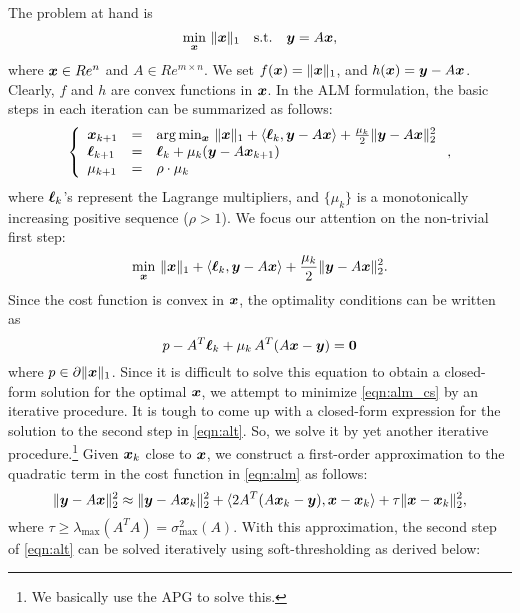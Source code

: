 The problem at hand is 
\begin{equation}
\min_{{\boldsymbol{x}}} \, \|{\boldsymbol{x}}\|_1 \quad \mathrm{s.t.} \quad {\boldsymbol{y}} = A{\boldsymbol{x}},
\end{equation}
where ${\boldsymbol{x}} \in Re^n$ and $A \in Re^{m\times n}$. 
\smallbreak
We set $f({\boldsymbol{x}}) = \|{\boldsymbol{x}}\|_1$, and $h({\boldsymbol{x}}) = {\boldsymbol{y}} - A{\boldsymbol{x}}$. Clearly, $f$ and $h$ are convex functions in ${\boldsymbol{x}}$. In the ALM formulation, the basic steps in each iteration can be summarized as follows:
\begin{equation}
\left \{ 
\begin{array}{lll}
{\boldsymbol{x}}_{k+1} & = & \arg\min_{{\boldsymbol{x}}} \, \|{\boldsymbol{x}}\|_1 + \langle {\boldsymbol\ell}_k, {\boldsymbol{y}} - A{\boldsymbol{x}} \rangle + \frac{\mu_k}{2}\|{\boldsymbol{y}} - A{\boldsymbol{x}}\|_2^2 \\
{\boldsymbol \ell}_{k+1} & = & {\boldsymbol \ell}_k + \mu_k ({\boldsymbol{y}} - A{\boldsymbol{x}}_{k+1}) \\
\mu_{k+1} & = & \rho\cdot\mu_k
\end{array} 
\right . ,
\end{equation}
where ${\boldsymbol \ell}_k$'s represent the Lagrange multipliers, and $\{\mu_k\}$ is a monotonically increasing positive sequence ($\rho > 1$).
\smallbreak
We focus our attention on the non-trivial first step:
\begin{equation}
\min_{{\boldsymbol{x}}} \, \|{\boldsymbol{x}}\|_1 + \langle {\boldsymbol\ell}_k, {\boldsymbol{y}} - A{\boldsymbol{x}} \rangle + \frac{\mu_k}{2}\|{\boldsymbol{y}} - A{\boldsymbol{x}}\|_2^2.
\label{eqn:alm_cs}
\end{equation}
Since the cost function is convex in ${\boldsymbol{x}}$, the optimality conditions can be written as
\begin{equation}
{p} - A^T{\boldsymbol \ell}_k + \mu_k\,A^T(A{\boldsymbol{x}} - {\boldsymbol{y}}) = \boldsymbol{0}
\end{equation}
where ${p} \in \partial \|{\boldsymbol{x}}\|_1$. Since it is difficult to solve this equation to obtain a closed-form solution for the optimal ${\boldsymbol{x}}$, we attempt to minimize \eqref{eqn:alm_cs} by an iterative procedure. 
\smallbreak
It is tough to come up with a closed-form expression for the solution to the second step in \eqref{eqn:alt}. So, we solve it by yet another iterative procedure.\footnote{We basically use the APG to solve this.} Given ${\boldsymbol{x}}_k$ close to ${\boldsymbol{x}}$, we construct a first-order approximation to the quadratic term in the cost function in \eqref{eqn:alm} as follows:
\begin{equation}
\|{\boldsymbol{y}} - A{\boldsymbol{x}}\|_2^2 \approx \|{\boldsymbol{y}} - A{\boldsymbol{x}}_k\|_2^2 + \langle 2A^T(A{\boldsymbol{x}}_k-{\boldsymbol{y}}), {\boldsymbol{x}} - {\boldsymbol{x}}_k \rangle + \tau\|{\boldsymbol{x}}-{\boldsymbol{x}}_k\|_2^2,
\end{equation}
where $\tau \geq \lambda_\mathrm{max} (A^TA) = \sigma^2_\mathrm{max}(A)$. With this approximation, the second step of \eqref{eqn:alt} can be solved iteratively using soft-thresholding as derived below:
